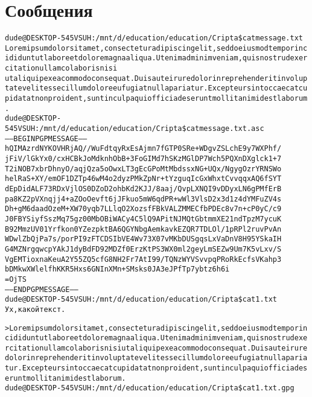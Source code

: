 \section{Сообщения}
\begin{alltt}
dude@DESKTOP-545VSUH:/mnt/d/education/education/Cripta\$ cat message.txt\\
Lorem ipsum dolor sit amet, consectetur adipiscing elit, sed do eiusmod tempor incididunt ut labore et dolore magna aliqua. Ut enim ad minim veniam, quis nostrud exercitation ullamco laboris nisi 
ut aliquip ex ea commodo consequat. Duis aute irure dolor in reprehenderit in voluptate velit esse cillum dolore eu fugiat nulla pariatur. Excepteur sint occaecat cupidatat non proident, sunt in culpa qui officia deserunt mollit anim id est laborum.\\
dude@DESKTOP-545VSUH:/mnt/d/education/education/Cripta\$ cat message.txt.asc \\
-----BEGIN PGP MESSAGE-----\\

hQIMAzrdNYKOVHRjAQ//WuFdtqyRxEsAjmn7fGTP0SRe+WDgvZSLchE9y7WXPhf/
jFiV/lGkYx0/cxHCBkJoMdknhObB+3FoGIMd7hSKzMGlDP7Wch5PQXnDXglck1+7
T2iNOB7xbrDhnyO/aqjQza5oOwxLT3gEcGPoMtMbdssxNG+UQx/NgygOzrYRNSWo
helRaS+XY/emOF1DZTp46wM4o2dyzPMkZpNr+tYzguqIcGxWhxtCvvqqxAQ6fSYT
dEpDidALF73RDxVjlOS0DZoD2ohbKd2KJJ/8aaj/QvpLXNQI9vDDyxLN6gPMfErB
pa8KZ2pVXnqjj4+aZOoOevft6jJFkuo5mW6qdPR+wWl3VlsD2x3d1z4dYMFuZV4s
Dh+gM6daadOzeM+XW70yqb7LLlqO2XozsfFBkVALZMMECfbPDEc8v7n+cP0yC/c9
J0FBYSiyfSszMq75gz00MbOBiWACy4C5lQ9APitNJMQtGbtmmXE21ndTpzM7ycuK
B92MmzUV01Yrfkon0YZezpktBA6QGYNbgAemkavkEZQR7TDLOl/1pRPl2ruvPvAn
WDwlZbQjPa7s/porPI9zFTCDSIbVE4Wv73X07vMKbDUSgqsLxVaDnV8H95YSkaIH
G4MZNrgqwcpYAkJ1dyBdFD92MDZf0ErzKtPS3WX0ml2geyLmSEZw9Um7K5vLxv/S
VgEMTioxnaKeuA2Y55ZQ5cfG8NH2Fr7AtI99/TQNzWYVSvvpqPRoRkEcfsVKahp3
bDMkwXWlelfhKKR5Hxs6GNInXMn+SMsks0JA3eJPfTp7ybtz6h6i
=OjTS\\
-----END PGP MESSAGE-----\\
dude@DESKTOP-545VSUH:/mnt/d/education/education/Cripta\$ cat 1.txt\\
Ух, какой текст.


> Lorem ipsum dolor sit amet, consectetur adipiscing elit, sed do eiusmod tempor incididunt ut labore et dolore magna aliqua. Ut enim ad minim veniam, quis nostrud exercitation ullamco laboris nisi ut aliquip ex ea commodo consequat. Duis aute irure dolor in reprehenderit in voluptate velit esse cillum dolore eu fugiat nulla pariatur. Excepteur sint occaecat cupidatat non proident, sunt in culpa qui officia deserunt mollit anim id est laborum.\\
dude@DESKTOP-545VSUH:/mnt/d/education/education/Cripta\$ cat 1.txt.gpg \\


\end{alltt}
